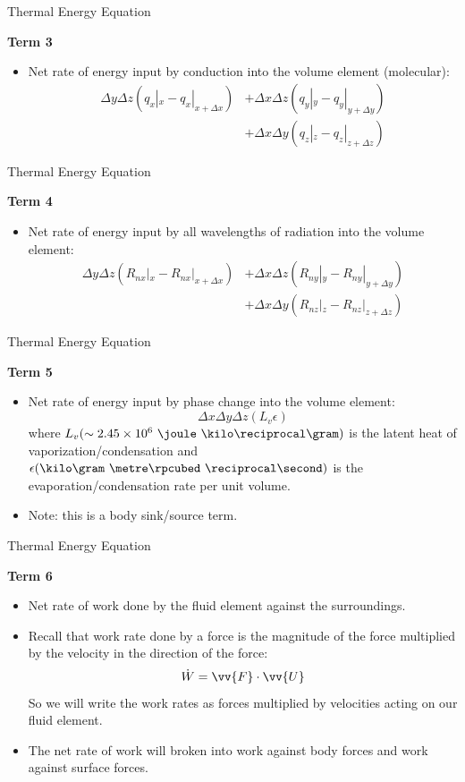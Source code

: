 \begin{frame}{Thermal Energy Equation}

\textbf{Term 3}
\begin{itemize}
	\item Net rate of energy input by conduction into the volume element (molecular):
	\begin{align*}
		\Delta y\Delta z (q_x|_x - q_x|_{x+\Delta x}) &+ \Delta x\Delta z (q_y|_y - q_y|_{y+\Delta y}) \\&+ \Delta x\Delta y (q_z|_z - q_z|_{z+\Delta z})
	\end{align*}
\end{itemize}
\end{frame}
\begin{frame}{Thermal Energy Equation}

\textbf{Term 4}
\begin{itemize}
	\item Net rate of energy input by all wavelengths of radiation into the volume element:
	\begin{align*}
		\Delta y\Delta z (R_{nx}|_x - R_{nx}|_{x+\Delta x}) &+ \Delta x\Delta z (R_{ny}|_y - R_{ny}|_{y+\Delta y}) \\&+ \Delta x\Delta y (R_{nz}|_z - R_{nz}|_{z+\Delta z})
	\end{align*}
\end{itemize}
\end{frame}
\begin{frame}{Thermal Energy Equation}

\textbf{Term 5}
\begin{itemize}
	\item Net rate of energy input by phase change into the volume element:
	$$\Delta x \Delta y \Delta z (L_v \epsilon)$$
	where $L_v(\sim 2.45\times 10^{6}\ \joule\ \kilo\reciprocal\gram)$ is the latent heat of vaporization/condensation and $\epsilon (\kilo\gram\ \metre\rpcubed\ \reciprocal\second)$ is the evaporation/condensation rate per unit volume.
	\item Note: this is a body sink/source term.
\end{itemize}
\end{frame}
\begin{frame}{Thermal Energy Equation}

\textbf{Term 6}
\begin{itemize}
	\item Net rate of work done by the fluid element against the surroundings.
	\item Recall that work rate done by a force is the magnitude of the force multiplied by the velocity in the direction of the force:
	$$\dot{W} = \vv{F}\cdot \vv{U}$$
	So we will write the work rates as forces multiplied by velocities acting on our fluid element.
	\item The net rate of work will broken into work against body forces and work against surface forces.
\end{itemize}
\end{frame}
